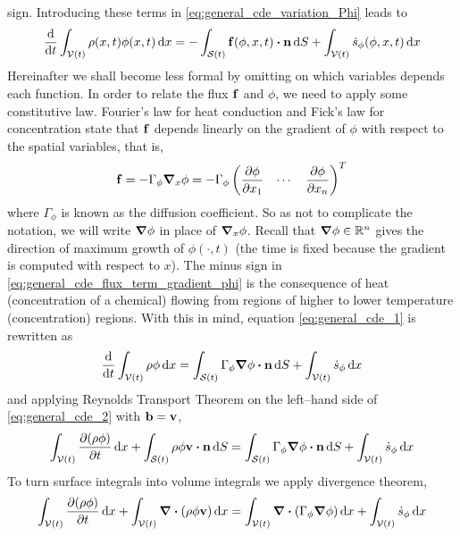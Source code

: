 sign. Introducing these terms in \eqref{eq:general_cde_variation_Phi} leads to
\begin{equation} \label{eq:general_cde_1}
	\frac{\dd}{\dd{t}} \int_{\cvt} \rho(x, t) \phi(x, t) \dd{x} = 
	- \int_{\cst} \vb{f}(\phi, x, t) \vdot \vb{n} \dd{S} 
	+ \int_{\cvt} \dot{s}_\phi (\phi, x, t) \dd{x}	
\end{equation}
Hereinafter we shall become less formal by omitting on which variables depends
each function. In order to relate the flux $\vb{f}$ and $\phi$, we need to apply
some constitutive law. Fourier's law for heat conduction and Fick's law for
concentration state that $\vb{f}$ depends linearly on the gradient of $\phi$
with respect to the spatial variables, that is,
\begin{equation} \label{eq:general_cde_flux_term_gradient_phi}
	\vb{f} = 
	-\Gamma_\phi \grad_{x} \phi = 
	-\Gamma_\phi
	\begin{pmatrix}
		\displaystyle\pdv{\phi}{x_1} & \cdots & \displaystyle\pdv{\phi}{x_n}
	\end{pmatrix}^T
\end{equation}
where $\Gamma_\phi$ is known as the diffusion coefficient. So as not to
complicate the notation, we will write $\grad{\phi}$ in place of $\grad_{x}
\phi$. Recall that $\grad{\phi} \in \mathbb{R}^n$ gives the direction of maximum
growth of $\phi(\cdot, t)$ (the time is fixed because the gradient is computed
with respect to $x$). The minus sign in
\eqref{eq:general_cde_flux_term_gradient_phi} is the consequence of heat
(concentration of a chemical) flowing from regions of higher to lower
temperature (concentration) regions. With this in mind, equation
\eqref{eq:general_cde_1} is rewritten as
\begin{equation} \label{eq:general_cde_2}
	\frac{\dd}{\dd{t}} \int_{\cvt} \rho \phi \dd{x} = 
	\int_{\cst} \Gamma_\phi \grad{\phi} \vdot \vb{n} \dd{S} +
	\int_{\cvt} \dot{s}_\phi \dd{x}	
\end{equation}
and applying Reynolds Transport Theorem on the left--hand side of
\eqref{eq:general_cde_2} with $\vb{b} = \vb{v}$,
\begin{equation}
	\int_{\cvt} \pdv{(\rho \phi)}{t} \dd{x} + 
	\int_{\cst} \rho \phi \vb{v} \vdot \vb{n} \dd{S} = 
	\int_{\cst} \Gamma_\phi \grad{\phi} \vdot \vb{n} \dd{S} +
	\int_{\cvt} \dot{s}_\phi \dd{x}	
\end{equation}
To turn surface integrals into volume integrals we apply divergence theorem,
\begin{equation}
	\int_{{\mathcal{V}(t)}} \pdv{(\rho \phi)}{t} \dd{x} + 
	\int_{{\mathcal{V}(t)}} \div(\rho \phi \vb{v}) \dd{x} = 
	\int_{{\mathcal{V}(t)}} \div(\Gamma_\phi \grad{\phi}) \dd{x} + 
	\int_{{\mathcal{V}(t)}} \dot{s}_\phi \dd{x}	
\end{equation}
